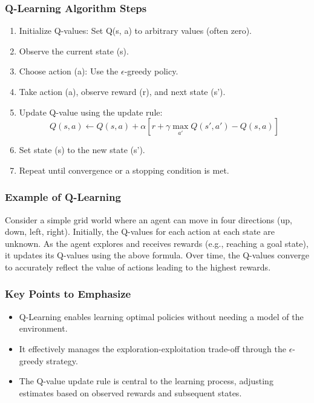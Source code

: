 \documentclass[aspectratio=169]{beamer}
\begin{document}
\begin{frame}[fragile]
    \frametitle{Q-Learning Algorithm Steps}
    \begin{enumerate}
        \item Initialize Q-values: Set Q(s, a) to arbitrary values (often zero).
        \item Observe the current state (s).
        \item Choose action (a): Use the $\epsilon$-greedy policy.
        \item Take action (a), observe reward (r), and next state (s').
        \item Update Q-value using the update rule:
        \begin{equation}
            Q(s, a) \gets Q(s, a) + \alpha \left[r + \gamma \max_{a'} Q(s', a') - Q(s, a)\right]
        \end{equation}
        \item Set state (s) to the new state (s').
        \item Repeat until convergence or a stopping condition is met.
    \end{enumerate}
\end{frame}

\begin{frame}[fragile]
    \frametitle{Example of Q-Learning}
    Consider a simple grid world where an agent can move in four directions (up, down, left, right). Initially, the Q-values for each action at each state are unknown. As the agent explores and receives rewards (e.g., reaching a goal state), it updates its Q-values using the above formula. Over time, the Q-values converge to accurately reflect the value of actions leading to the highest rewards.
\end{frame}

\begin{frame}[fragile]
    \frametitle{Key Points to Emphasize}
    \begin{itemize}
        \item Q-Learning enables learning optimal policies without needing a model of the environment.
        \item It effectively manages the exploration-exploitation trade-off through the $\epsilon$-greedy strategy.
        \item The Q-value update rule is central to the learning process, adjusting estimates based on observed rewards and subsequent states.
    \end{itemize}
\end{frame}
\end{document}
